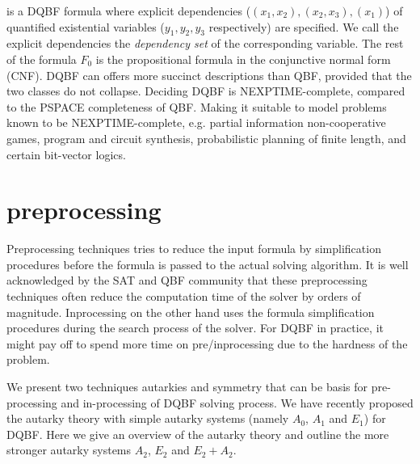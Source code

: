 \documentclass[conference]{IEEEtran}
\begin{document}
is a DQBF formula where explicit dependencies ($(x_1,x_2), (x_2,x_3), (x_1)$) of quantified existential variables ($y_1, y_2, y_3$ respectively) are specified. We call the explicit dependencies the \textit{dependency set} of the corresponding variable. 
%
The rest of the formula $F_0$ is the propositional formula in the conjunctive normal form (CNF).
%
DQBF can offers more succinct descriptions than
QBF, provided that the two classes do not collapse.
%
Deciding DQBF is NEXPTIME-complete, compared to the PSPACE completeness of QBF.
%
Making it suitable to model problems known to be NEXPTIME-complete, e.g. partial information non-cooperative games, program and circuit synthesis, probabilistic planning of finite length, and certain bit-vector logics.

\section{preprocessing}
\label{sec:pre}
Preprocessing techniques 
%
tries to reduce the input formula by simplification procedures before the formula is passed to the actual solving algorithm.
%
It is well acknowledged by the SAT and QBF community that these preprocessing techniques often reduce the computation time of the solver by orders of magnitude.
Inprocessing on the other hand uses the formula simplification procedures during the search process of the solver. 
%
For DQBF in practice, it might pay off to spend
more time on pre/inprocessing due to the hardness of the problem.

%

We present two techniques autarkies and symmetry that can be basis for pre-processing and in-processing of DQBF solving process. 
%
We have recently proposed the autarky theory with simple autarky systems (namely $A_0$, $A_1$ and $E_1$) for DQBF. 
%
Here we give an overview of the autarky theory and outline the more stronger autarky systems $A_2$, $E_2$ and $E_2 + A_2$. 
%
\end{document}

